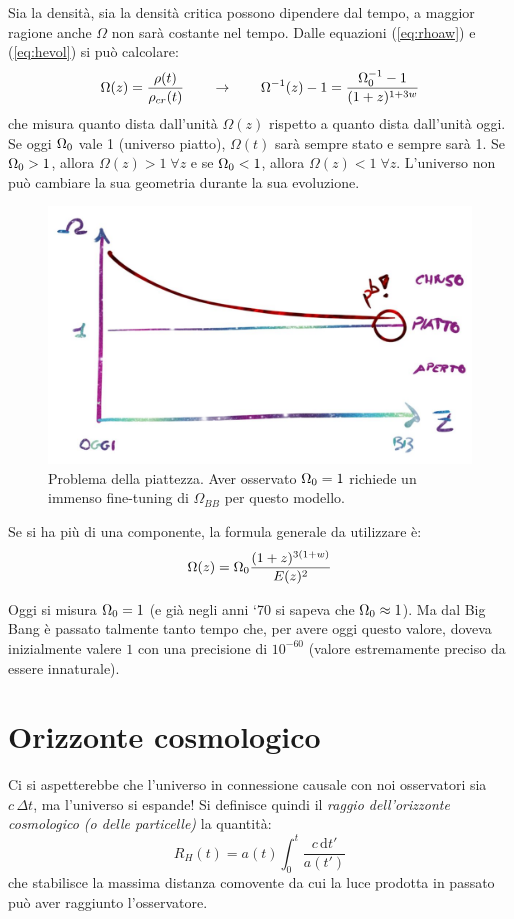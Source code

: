 Sia la densità, sia la densità critica possono dipendere dal tempo, a maggior ragione anche $\Omega$ non sarà costante nel tempo. Dalle equazioni (\ref{eq:rhoaw}) e (\ref{eq:hevol}) si può calcolare:
\begin{equation*}
    \Omega(z) = \frac{\rho(t)}{\rho_{cr}(t)} \qquad\rightarrow \qquad \Omega^{-1}(z) -1 = \frac{\Omega_0^{-1}-1}{(1+z)^{1+3w}}
\end{equation*}
che misura quanto dista dall'unità $\Omega (z)$ rispetto a quanto dista dall'unità oggi. Se oggi $\Omega_0$ vale 1 (universo piatto), $\Omega(t)$ sarà sempre stato e sempre sarà 1. Se $\Omega_0 > 1$, allora $\Omega(z) > 1\;  \forall z$ e se $\Omega_0 < 1$, allora $\Omega(z) < 1\;\forall z$. L'universo non può cambiare la sua geometria durante la sua evoluzione.
\begin{figure}[ht]
    \centering
    \includegraphics[width=.8\textwidth]{Pictures/2/omega-z.jpg}
    \caption{Problema della piattezza. Aver osservato $\Omega_0 = 1$ richiede un immenso fine-tuning di $\Omega_{BB}$ per questo modello.}
    \label{fig:2omegaz}
\end{figure}

Se si ha più di una componente, la formula generale da utilizzare è:
\begin{equation}
    \Omega (z) = \Omega_0 \frac{(1+z)^{3(1+w)}}{E(z)^2}
\end{equation}


\begin{definition}
 Oggi si misura $\Omega_0 =1$ (e già negli anni `70 si sapeva che $\Omega_0 \approx 1$). Ma dal Big Bang è passato talmente tanto tempo che, per avere oggi questo valore, doveva inizialmente valere $1$ con una precisione di $10^{-60}$ (valore estremamente preciso da essere innaturale). 
\end{definition}


\section{Orizzonte cosmologico}
Ci si aspetterebbe che l'universo in connessione causale con noi osservatori sia $c\, \Delta t$, ma l'universo si espande! Si definisce quindi il \textit{raggio dell'orizzonte cosmologico (o delle particelle)} la quantità:
\begin{equation}
    R_H (t) = a(t) \int_0^t \frac{c\, \mathrm{d}t'}{a(t')} \label{eq:raggioriz}
\end{equation}
che stabilisce la massima distanza comovente da cui la luce prodotta in passato può aver raggiunto l'osservatore.

